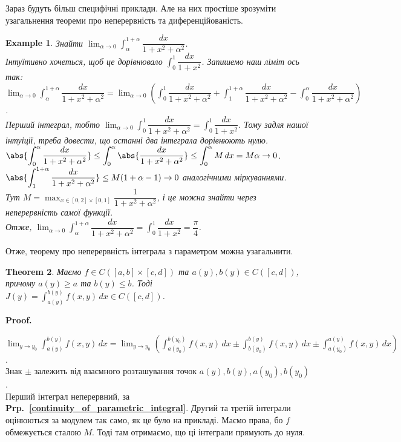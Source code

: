 \documentclass[a4paper, 10pt]{article}
\makeatletter
\def\huge{\displaystyle}
\def\qed{$\blacksquare$}
\theoremstyle{theoremdd}
\newtheorem{theorem}{Theorem}[subsection]
\theoremstyle{theoremdd}
\theoremstyle{theoremdd}
\theoremstyle{theoremdd}
\theoremstyle{theoremdd}
\newtheorem{example}[theorem]{Example}
\theoremstyle{theoremdd}
\theoremstyle{theoremdd}
\theoremstyle{theoremdd}
\theoremstyle{theoremdd}
\newcommand\prpref[1]{\textbf{Prp.~\ref{#1}}}
\renewenvironment{proof}[1][Proof.\\]{\par
\pushQED{\hfill \qed}%
\normalfont \topsep6\p@\@plus6\p@\relax
\trivlist
\item\relax
{\bfseries
#1\@addpunct{.}}\hspace\labelsep\ignorespaces
}{%
\popQED\endtrivlist\@endpefalse
}
\makeatother
\begin{document}
Зараз будуть більш специфічні приклади. Але на них простіше зрозуміти узагальнення теореми про неперервність та диференційованість.
\begin{example}
Знайти $\huge\lim_{\alpha \to 0} \int_{\alpha}^{1+\alpha} \dfrac{dx}{1+x^2+\alpha^2}$.\\
Інтуїтивно хочеться, щоб це дорівнювало $\huge\int_0^1 \dfrac{dx}{1+x^2}$. Запишемо наш ліміт ось так:\\
$\huge\lim_{\alpha \to 0} \int_{\alpha}^{1+\alpha} \dfrac{dx}{1+x^2+\alpha^2} = \lim_{\alpha \to 0} \left( \int_0^1 \dfrac{dx}{1+x^2+\alpha^2} + \int_1^{1+\alpha} \dfrac{dx}{1+x^2+\alpha^2} - \int_0^{\alpha} \dfrac{dx}{1+x^2+\alpha^2} \right)$.\\
Перший інтеграл, тобто $\huge \lim_{\alpha \to 0} \int_0^1 \dfrac{dx}{1+x^2+\alpha^2} = \int_0^1 \dfrac{dx}{1+x^2}$. Тому задля нашої інтуіції, треба довести, що останні два інтеграла дорівнюють нулю.\\
$\huge \abs{\int_0^\alpha \dfrac{dx}{1+x^2+\alpha^2}} \leq \int_0^\alpha \abs{\dfrac{dx}{1+x^2+\alpha^2}} \leq \int_0^\alpha M\,dx = M \alpha \to 0$.\\
$\huge \abs{\int_1^{1+\alpha} \dfrac{dx}{1+x^2+\alpha^2}} \leq M (1+\alpha-1) \to 0$ аналогічними міркуваннями.\\
Тут $M = \huge\max_{x \in [0,2] \times [0,1]} \dfrac{1}{1+x^2+\alpha^2}$, і це можна знайти через неперервність самої функції.\\
Отже, $\huge\lim_{\alpha \to 0} \int_\alpha^{1+\alpha} \dfrac{dx}{1+x^2+\alpha^2} = \int_0^1 \dfrac{dx}{1+x^2} = \dfrac{\pi}{4}$.
\end{example}

Отже, теорему про неперервність інтеграла з параметром можна узагальнити.

\begin{theorem}
Маємо $f \in C([a,b] \times [c,d])$ та $a(y),b(y) \in C([c,d])$, причому $a(y) \geq a$ та $b(y) \leq b$. Тоді $J(y) = \huge\int_{a(y)}^{b(y)} f(x,y)\,dx \in C([c,d])$.
\end{theorem}

\begin{proof}
$\displaystyle\lim_{y \to y_0} \int_{a(y)}^{b(y)} f(x,y)\,dx = \lim_{y \to y_0}\left( \int_{a(y_0)}^{b(y_0)} f(x,y)\,dx \pm \int_{b(y_0)}^{b(y)} f(x,y)\,dx \pm \int_{a(y_0)}^{a(y)}f(x,y)\,dx \right)$.\\
Знак $\pm$ залежить від взаємного розташування точок $a(y), b(y), a(y_0), b(y_0)$.\\
Перший інтеграл неперервний, за \prpref{continuity_of_parametric_integral}. Другий та третій інтеграли оцінюються за модулем так само, як це було на прикладі. Маємо права, бо $f$ обмежується сталою $M$. Тоді там отримаємо, що ці інтеграли прямують до нуля.
\end{proof}
\end{document}
